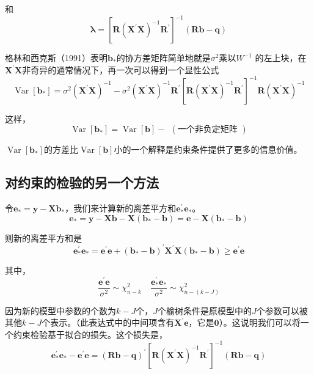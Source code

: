 	和
		$$ \boldsymbol{\lambda}=\left[\boldsymbol{R}\left(\boldsymbol{X}^{\prime} \boldsymbol{X}\right)^{-1} 
		\boldsymbol{R}^{\prime}\right]^{-1}(\boldsymbol{R b}-\boldsymbol{q}) $$

	格林和西克斯（1991）表明$ \boldsymbol{b}_{*} $的协方差矩阵简单地就是$ \sigma^{2} $乘以$ W^{-1} $
	的左上块，在$ \boldsymbol{X}^{\prime} \boldsymbol{X} $非奇异的通常情况下，再一次可以得到一个显性公式
	$$ \operatorname{Var}\left[\boldsymbol{b}_{*}\right]=\sigma^{2}\left(\boldsymbol{X}^{\prime} \boldsymbol{X}\right)^{-1}-\sigma^{2}\left(\boldsymbol{X}^{\prime} \boldsymbol{X}\right)^{-1} \boldsymbol{R}^{\prime}\left[\boldsymbol{R}\left(\boldsymbol{X}^{\prime} \boldsymbol{X}\right)^{-1} \boldsymbol{R}^{\prime}\right]^{-1} \boldsymbol{R}\left(\boldsymbol{X}^{\prime} \boldsymbol{X}\right)^{-1} $$

	这样，
	$$ \operatorname{Var}\left[\boldsymbol{b}_{*}\right]=\operatorname{Var}[\boldsymbol{b}]-\ \ (\text {一个非负定矩阵 }) $$

	$ \operatorname{Var}\left[\boldsymbol{b}_{*}\right] $的方差比$ \operatorname{Var}[\boldsymbol{b}] $小的一个解释是约束条件提供了更多的信息价值。
	\subsection{对约束的检验的另一个方法}
	令$ \boldsymbol{e}_{*}=\boldsymbol{y}-\boldsymbol{X b}_{*} $，我们来计算新的离差平方和$ \boldsymbol{e}_{*}^{\prime} \boldsymbol{e}_{*} $。
	$$ \boldsymbol{e}_{*}=\boldsymbol{y}-\boldsymbol{Xb}-\boldsymbol{X}\left(\boldsymbol{b}_{*}-\boldsymbol{b}\right)=\boldsymbol{e}-\boldsymbol{X}\left(\boldsymbol{b}_{*}-\boldsymbol{b}\right) $$
	
	则新的离差平方和是
	$$ \boldsymbol{e}_{*}^{\prime} \boldsymbol{e}_{*}=\boldsymbol{e}^{\prime} \boldsymbol{e}+\left(\boldsymbol{b}_{*}-\boldsymbol{b}\right)^{\prime} \boldsymbol{X}^{\prime} \boldsymbol{X}\left(\boldsymbol{b}_{*}-\boldsymbol{b}\right) \geq \boldsymbol{e}^{\prime} \boldsymbol{e} $$

	其中，
	$$ \frac{\boldsymbol{e}^{\prime} \boldsymbol{e}}{\sigma^{2}} \sim \chi_{n-k}^{2}\quad \frac{\boldsymbol{e}_{*}^{\prime} \boldsymbol{e}_{*}}{\sigma^{2}} \sim \chi_{n-(k-J)}^{2}  $$

	因为新的模型中参数的个数为$ k-J $个，$ J $个榆树条件是原模型中的$ J $个参数可以被其他$ k-J $个表示。（此表达式中的中间项含有$ \boldsymbol{X}^{\prime} \boldsymbol{e} $，它是$ \boldsymbol{0} $）。这说明我们可以将一个约束检验基于拟合的损失。这个损失是，
	$$ \boldsymbol{e}_{*}^{\prime} \boldsymbol{e}_{*}-\boldsymbol{e}^{\prime} \boldsymbol{e}=(\boldsymbol{Rb}-\boldsymbol{q})^{\prime}\left[\boldsymbol{R}\left(\boldsymbol{X}^{\prime} \boldsymbol{X}\right)^{-1} \boldsymbol{R}^{\prime}\right]^{-1}(\boldsymbol{Rb}-\boldsymbol{q}) $$

